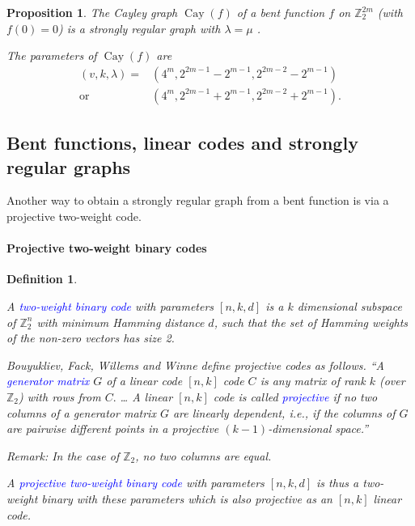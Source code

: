\documentclass[12pt,a4paper]{article}
\newcommand{\mb}[1]{\mathbb{#1}}
\newcommand{\Z}{\mb{Z}}
\newcommand{\Emph}[1]{\emph{\textcolor{blue}{#1}}}
\newcommand{\Cay}[1]{\operatorname{Cay}\left(#1\right)}
\newtheorem{Proposition}{Proposition}
\newtheorem{Definition}{Definition}
\begin{document}


\begin{Proposition}
\label{pr-Cayley-bent-strongly-regular}
The Cayley graph $\Cay{f}$ of a bent function $f$ on $\Z_2^{2m}$
(with $f(0)=0$) is a strongly regular graph with $\lambda = \mu$ \cite[Lemma 12]{BerC99}.

The parameters of $\Cay{f}$ are \cite[Theorem 6.2.10]{Dil74} \cite[Theorem 3.2]{HuaY04}
\begin{align*}
(v,k,\lambda) = &(4^m, 2^{2 m - 1} - 2^{m-1}, 2^{2 m - 2} - 2^{m-1})
\\
  \text{or} \quad &(4^m, 2^{2 m - 1} + 2^{m-1}, 2^{2 m - 2} + 2^{m-1}).
\end{align*}
\end{Proposition}

%
\subsection{Bent functions, linear codes and strongly regular graphs}
Another way to obtain a strongly regular graph from a bent function is via a projective two-weight
code.
\paragraph*{Projective two-weight binary codes}

\begin{Definition}
\label{def-two-weight-codes}
\cite{BouFFWW2006} \cite{Ton96uniformly}

A \Emph{two-weight binary code} with parameters $[n,k,d]$ is a $k$ dimensional subspace of $\Z_2^n$
with
minimum Hamming distance $d$, such that the set of Hamming weights of the non-zero vectors has size
2.

Bouyukliev, Fack, Willems and Winne \cite[p. 60]{BouFFWW2006} define projective codes as follows.
``A \Emph{generator matrix} $G$ of a linear code $[n, k]$ code $C$ is any matrix
of rank $k$ (over $\Z_2$) with rows from $C.$ \ldots
A linear $[n, k]$ code is called \Emph{projective} if no two columns of a generator matrix
$G$ are linearly dependent, i.e., if the columns of $G$ are pairwise different points in a
projective $(k-1)$-dimensional space.''

Remark: In the case of $\Z_2$, no two columns are equal.

A \Emph{projective two-weight binary code} with parameters $[n, k, d]$ is thus a
two-weight binary with these parameters which is also projective as an $[n, k]$ linear code.
%
%
%
\end{Definition}
\end{document}
